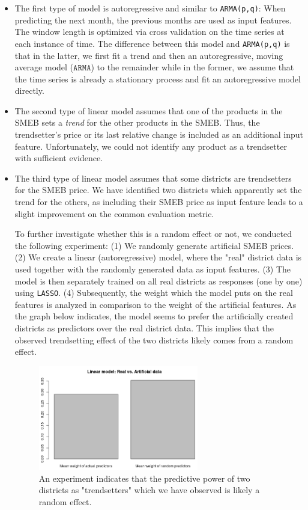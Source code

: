 \documentclass[11pt,a4paper]{article}
\begin{document}
	\begin{itemize}
		\item The first type of model is autoregressive and similar to \texttt{ARMA(p,q)}: When predicting the next month, the previous months are used as input features. The window length is optimized via cross validation on the time series at each instance of time. The difference between this model and \texttt{ARMA(p,q)} is that in the latter, we first fit a trend and then an autoregressive, moving average model ($\mathtt{ARMA}$) to the remainder while in the former, we assume that the time series is already a stationary process and fit an autoregressive model directly.
	
		\item The second type of linear model assumes that one of the products in the SMEB sets a \textit{trend} for the other products in the SMEB. Thus, the trendsetter's price or its last relative change is included as an additional input feature. Unfortunately, we could not identify any product as a trendsetter with sufficient evidence.
	
		\item The third type of linear model assumes that some districts are trendsetters for the SMEB price. We have identified two districts which apparently set the trend for the others, as including their SMEB price as input feature leads to a slight improvement on the common evaluation metric.
		
		To further investigate whether this is a random effect or not, we conducted the following experiment: (1) We randomly generate artificial SMEB prices. (2) We create a linear (autoregressive) model, where the "real" district data is used together with the randomly generated data as input features. (3) The model is then separately trained on all real districts as responses (one by one) using \texttt{LASSO}. (4) Subsequently, the weight which the model puts on the real features is analyzed in comparison to the weight of the artificial features. As the graph below indicates, the model seems to prefer the artificially created districts as predictors over the real district data. This implies that the observed trendsetting effect of the two districts likely comes from a random effect.
		
		\begin{figure}[h!]
			\centering
			\includegraphics[width=0.66\textwidth]{image2.png}
			\caption{An experiment indicates that the predictive power of two districts as "trendsetters" which we have observed is likely a random effect.}
			\label{fig:image2}
		\end{figure}
	\end{itemize}
	
\end{document}
